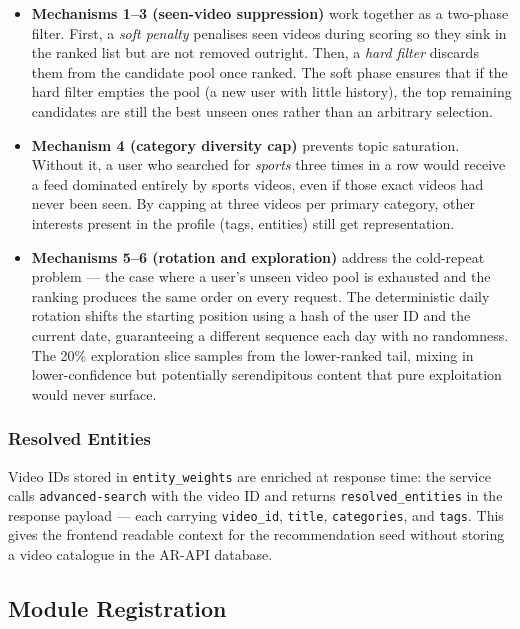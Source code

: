 \begin{itemize}
  \item \textbf{Mechanisms 1--3 (seen-video suppression)} work together as a two-phase
    filter. First, a \emph{soft penalty} penalises seen videos during scoring so they sink in
    the ranked list but are not removed outright. Then, a \emph{hard filter} discards them from
    the candidate pool once ranked. The soft phase ensures that if the hard filter empties the
    pool (a new user with little history), the top remaining candidates are still the best
    unseen ones rather than an arbitrary selection.

  \item \textbf{Mechanism 4 (category diversity cap)} prevents topic saturation.
    Without it, a user who searched for \emph{sports} three times in a row would receive a
    feed dominated entirely by sports videos, even if those exact videos had never been seen.
    By capping at three videos per primary category, other interests present in the profile
    (tags, entities) still get representation.

  \item \textbf{Mechanisms 5--6 (rotation and exploration)} address the cold-repeat problem
    — the case where a user's unseen video pool is exhausted and the ranking produces the same
    order on every request. The deterministic daily rotation shifts the starting position using
    a hash of the user ID and the current date, guaranteeing a different sequence each day
    with no randomness. The 20\% exploration slice samples from the lower-ranked tail, mixing
    in lower-confidence but potentially serendipitous content that pure exploitation would
    never surface.
\end{itemize}

\subsubsection{Resolved Entities}

Video IDs stored in \texttt{entity\_weights} are enriched at response time: the service calls
\texttt{advanced-search} with the video ID and returns \texttt{resolved\_entities} in the
response payload — each carrying \texttt{video\_id}, \texttt{title}, \texttt{categories}, and
\texttt{tags}. This gives the frontend readable context for the recommendation seed without
storing a video catalogue in the AR-API database.

\subsection{Module Registration}


